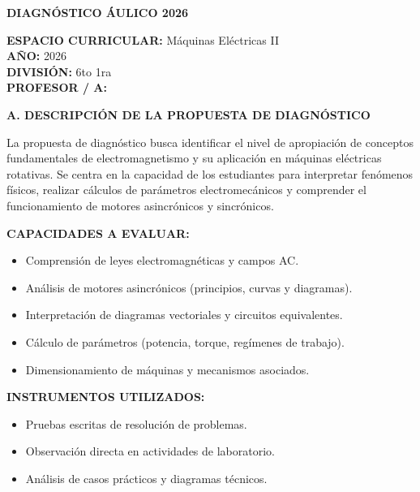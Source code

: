 \documentclass[a4paper,12pt]{article}
\begin{document}
\begin{center}
  \fontsize{14pt}{16pt}\selectfont \textbf{\uppercase{Diagnóstico Áulico 2026}}
\end{center}

\vspace{0.3cm}

\raggedright
\textbf{ESPACIO CURRICULAR:} Máquinas Eléctricas II \\
\textbf{AÑO:} 2026 \\
\textbf{DIVISIÓN:} 6to 1ra \\
\textbf{PROFESOR / A:} \profesor

\vspace{0.5cm}

\begin{center}\fontsize{12pt}{14pt}\selectfont \textbf{\uppercase{A. DESCRIPCIÓN DE LA PROPUESTA DE DIAGNÓSTICO}}\end{center}

\fontsize{12pt}{14pt}\selectfont
La propuesta de diagnóstico busca identificar el nivel de apropiación de conceptos fundamentales de electromagnetismo y su aplicación en máquinas eléctricas rotativas. Se centra en la capacidad de los estudiantes para interpretar fenómenos físicos, realizar cálculos de parámetros electromecánicos y comprender el funcionamiento de motores asincrónicos y sincrónicos.

\vspace{0.3cm}
\textbf{CAPACIDADES A EVALUAR:}
\begin{itemize}[leftmargin=*, nosep]
  \item Comprensión de leyes electromagnéticas y campos AC.
  \item Análisis de motores asincrónicos (principios, curvas y diagramas).
  \item Interpretación de diagramas vectoriales y circuitos equivalentes.
  \item Cálculo de parámetros (potencia, torque, regímenes de trabajo).
  \item Dimensionamiento de máquinas y mecanismos asociados.
\end{itemize}

\vspace{0.3cm}
\textbf{INSTRUMENTOS UTILIZADOS:}
\begin{itemize}[leftmargin=*, nosep]
  \item Pruebas escritas de resolución de problemas.
  \item Observación directa en actividades de laboratorio.
  \item Análisis de casos prácticos y diagramas técnicos.
\end{itemize}
\end{document}
